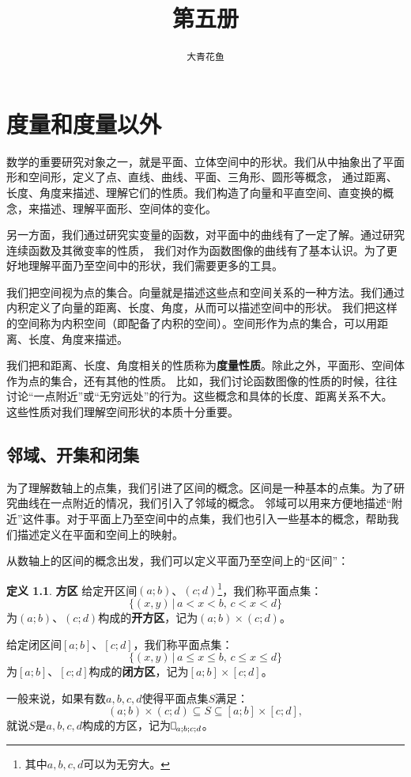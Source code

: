 \documentclass[12pt,UTF8]{ctexbook}
\title{\zihao{0} \bfseries 第五册}
\author{\zihao{2} \texttt{大青花鱼}}
\date{}
\newcommand{\rectbx}{%
    \mathord{\text{%
        \tikz[baseline] \draw (0,.1ex) -- (.4em,.1ex) -- (.4em,1.5ex) -- (0em,1.5ex) -- cycle;}
    }
}
\theoremstyle{definition}
\newtheorem{df}{定义}[section]
\theoremstyle{plain}
\begin{document}
\maketitle
\tableofcontents
\newpage

\chapter{度量和度量以外}

数学的重要研究对象之一，就是平面、立体空间中的形状。我们从中抽象出了平面形和空间形，定义了点、直线、曲线、平面、三角形、圆形等概念，
通过距离、长度、角度来描述、理解它们的性质。我们构造了向量和平直空间、直变换的概念，来描述、理解平面形、空间体的变化。

另一方面，我们通过研究实变量的函数，对平面中的曲线有了一定了解。通过研究连续函数及其微变率的性质，
我们对作为函数图像的曲线有了基本认识。为了更好地理解平面乃至空间中的形状，我们需要更多的工具。

我们把空间视为点的集合。向量就是描述这些点和空间关系的一种方法。我们通过内积定义了向量的距离、长度、角度，从而可以描述空间中的形状。
我们把这样的空间称为内积空间（即配备了内积的空间）。空间形作为点的集合，可以用距离、长度、角度来描述。

我们把和距离、长度、角度相关的性质称为\textbf{度量性质}。除此之外，平面形、空间体作为点的集合，还有其他的性质。
比如，我们讨论函数图像的性质的时候，往往讨论“一点附近”或“无穷远处”的行为。这些概念和具体的长度、距离关系不大。
这些性质对我们理解空间形状的本质十分重要。

\section{邻域、开集和闭集}

为了理解数轴上的点集，我们引进了区间的概念。区间是一种基本的点集。为了研究曲线在一点附近的情况，我们引入了邻域的概念。
邻域可以用来方便地描述“附近”这件事。对于平面上乃至空间中的点集，我们也引入一些基本的概念，帮助我们描述定义在平面和空间上的映射。

从数轴上的区间的概念出发，我们可以定义平面乃至空间上的“区间”：

\begin{df}{\textbf{方区}}
    给定开区间$(a;b)$、$(c;d)$\footnote{其中$a,b,c,d$可以为无穷大。}，我们称平面点集：
    $$\{(x, y) \, | \, a < x < b,\, c< x < d\}$$
    为$(a;b)$、$(c;d)$构成的\textbf{开方区}，记为$(a;b)\times(c;d)$。

    给定闭区间$[a;b]$、$[c;d]$，我们称平面点集：
    $$\{(x, y) \, | \, a \leqslant x \leqslant b,\, c \leqslant x \leqslant d\}$$
    为$[a;b]$、$[c;d]$构成的\textbf{闭方区}，记为$[a;b]\times[c;d]$。

    一般来说，如果有数$a,b,c,d$使得平面点集$S$满足：
    $$(a;b)\times(c;d) \subseteq S \subseteq [a;b]\times[c;d],$$
    就说$S$是$a,b,c,d$构成的方区，记为$\rectbx_{a;b;c;d}$。

\end{df}
\end{document}
